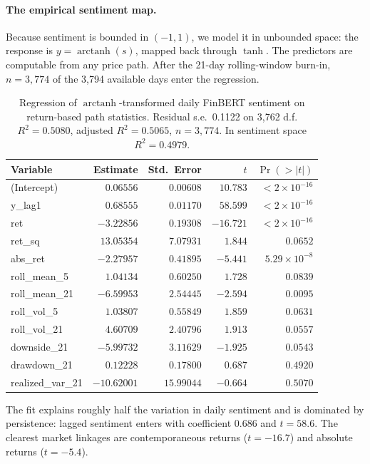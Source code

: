 \documentclass[11pt,a4paper]{article}
\begin{document}
\paragraph{The empirical sentiment map.}
Because sentiment is bounded in $(-1,1)$, we model it in unbounded space: the
response is $y = \operatorname{arctanh}(s)$, mapped back through $\tanh$. The
predictors are computable from any price path. After the 21-day rolling-window
burn-in, $n = 3{,}774$ of the 3{,}794 available days enter the regression.

\begin{table}[h]
\centering
\caption{Regression of $\operatorname{arctanh}$-transformed daily FinBERT
sentiment on return-based path statistics. Residual s.e.\ 0.1122 on 3{,}762 d.f.
$R^2 = 0.5080$, adjusted $R^2 = 0.5065$, $n = 3{,}774$. In sentiment space
$R^2 = 0.4979$.}
\label{tab:regression}
\begin{tabular}{lrrrr}
\toprule
Variable & Estimate & Std.\ Error & $t$ & $\Pr(>|t|)$ \\
\midrule
(Intercept)      & $0.06556$   & $0.00608$  & $10.783$  & $<2\times10^{-16}$ \\
y\_lag1          & $0.68555$   & $0.01170$  & $58.599$  & $<2\times10^{-16}$ \\
ret              & $-3.22856$  & $0.19308$  & $-16.721$ & $<2\times10^{-16}$ \\
ret\_sq          & $13.05354$  & $7.07931$  & $1.844$   & $0.0652$ \\
abs\_ret         & $-2.27957$  & $0.41895$  & $-5.441$  & $5.29\times10^{-8}$ \\
roll\_mean\_5    & $1.04134$   & $0.60250$  & $1.728$   & $0.0839$ \\
roll\_mean\_21   & $-6.59953$  & $2.54445$  & $-2.594$  & $0.0095$ \\
roll\_vol\_5     & $1.03807$   & $0.55849$  & $1.859$   & $0.0631$ \\
roll\_vol\_21    & $4.60709$   & $2.40796$  & $1.913$   & $0.0557$ \\
downside\_21     & $-5.99732$  & $3.11629$  & $-1.925$  & $0.0543$ \\
drawdown\_21     & $0.12228$   & $0.17800$  & $0.687$   & $0.4920$ \\
realized\_var\_21& $-10.62001$ & $15.99044$ & $-0.664$  & $0.5070$ \\
\bottomrule
\end{tabular}
\end{table}

The fit explains roughly half the variation in daily sentiment and is dominated
by persistence: lagged sentiment enters with coefficient 0.686 and $t = 58.6$.
The clearest market linkages are contemporaneous returns ($t = -16.7$) and
absolute returns ($t = -5.4$).
\end{document}
